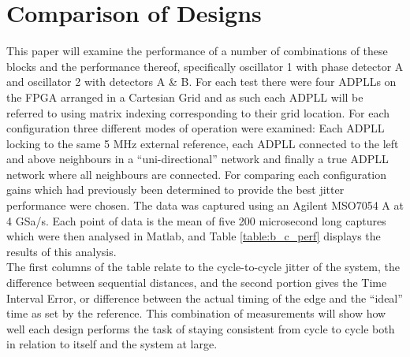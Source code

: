 \documentclass[conference]{IEEEtran}
\begin{document}
\section{Comparison of Designs}
This paper will examine the performance of a number of combinations of these blocks and the performance thereof, specifically oscillator 1 with phase detector A and oscillator 2 with detectors A \& B. For each test there were four ADPLLs on the FPGA arranged in a Cartesian Grid and as such each ADPLL will be referred to using matrix indexing corresponding to their grid location. For each configuration three different modes of operation were examined: Each ADPLL locking to the same 5 MHz external reference, each ADPLL connected to the left and above neighbours in a ``uni-directional'' network and finally a true ADPLL network where all neighbours are connected. For comparing each configuration gains which had previously been determined to provide the best jitter performance were chosen. The data was captured using an Agilent MSO7054 A at 4 GSa/s. Each point of data is the mean of five 200 microsecond long captures which were then analysed in Matlab, and Table \ref{table:b_c_perf} displays the results of this analysis.\\
The first columns of the table relate to the cycle-to-cycle jitter of the system, the difference between sequential distances, and the second portion gives the Time Interval Error, or difference between the actual timing of the edge and the ``ideal'' time as set by the reference. This combination of measurements will show how well each design performs the task of staying consistent from cycle to cycle both in relation to itself and the system at large.
\end{document}
